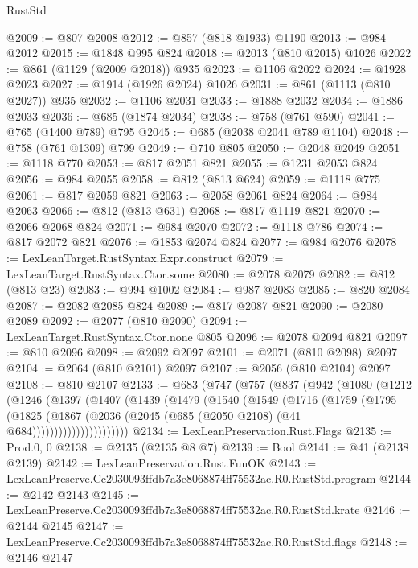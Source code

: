 \begin{lexlean}{RustStd}
\begin{coremodule}
@2009 := @807 @2008
@2012 := @857 (@818 @1933) @1190
@2013 := @984 @2012
@2015 := @1848 @995 @824
@2018 := @2013 (@810 @2015) @1026
@2022 := @861 (@1129 (@2009 @2018)) @935
@2023 := @1106 @2022
@2024 := @1928 @2023
@2027 := @1914 (@1926 @2024) @1026
@2031 := @861 (@1113 (@810 @2027)) @935
@2032 := @1106 @2031
@2033 := @1888 @2032
@2034 := @1886 @2033
@2036 := @685 (@1874 @2034)
@2038 := @758 (@761 @590)
@2041 := @765 (@1400 @789) @795
@2045 := @685 (@2038 @2041 @789 @1104)
@2048 := @758 (@761 @1309) @799
@2049 := @710 @805
@2050 := @2048 @2049
@2051 := @1118 @770
@2053 := @817 @2051 @821
@2055 := @1231 @2053 @824
@2056 := @984 @2055
@2058 := @812 (@813 @624)
@2059 := @1118 @775
@2061 := @817 @2059 @821
@2063 := @2058 @2061 @824
@2064 := @984 @2063
@2066 := @812 (@813 @631)
@2068 := @817 @1119 @821
@2070 := @2066 @2068 @824
@2071 := @984 @2070
@2072 := @1118 @786
@2074 := @817 @2072 @821
@2076 := @1853 @2074 @824
@2077 := @984 @2076
@2078 := LexLeanTarget.RustSyntax.Expr.construct
@2079 := LexLeanTarget.RustSyntax.Ctor.some
@2080 := @2078 @2079
@2082 := @812 (@813 @23)
@2083 := @994 @1002
@2084 := @987 @2083
@2085 := @820 @2084
@2087 := @2082 @2085 @824
@2089 := @817 @2087 @821
@2090 := @2080 @2089
@2092 := @2077 (@810 @2090)
@2094 := LexLeanTarget.RustSyntax.Ctor.none @805
@2096 := @2078 @2094 @821
@2097 := @810 @2096
@2098 := @2092 @2097
@2101 := @2071 (@810 @2098) @2097
@2104 := @2064 (@810 @2101) @2097
@2107 := @2056 (@810 @2104) @2097
@2108 := @810 @2107
@2133 := @683
    (@747
      (@757
        (@837
          (@942
            (@1080
              (@1212
                (@1246
                  (@1397
                    (@1407
                      (@1439
                        (@1479
                          (@1540
                            (@1549
                              (@1716
                                (@1759
                                  (@1795
                                    (@1825
                                      (@1867
                                        (@2036
                                          (@2045 (@685 (@2050 @2108) (@41 @684))))))))))))))))))))))
@2134 := LexLeanPreservation.Rust.Flags
@2135 := Prod.{0, 0}
@2138 := @2135 (@2135 @8 @7)
@2139 := Bool
@2141 := @41 (@2138 @2139)
@2142 := LexLeanPreservation.Rust.FunOK
@2143 := LexLeanPreserve.Cc2030093ffdb7a3e8068874ff75532ac.R0.RustStd.program
@2144 := @2142 @2143
@2145 := LexLeanPreserve.Cc2030093ffdb7a3e8068874ff75532ac.R0.RustStd.krate
@2146 := @2144 @2145
@2147 := LexLeanPreserve.Cc2030093ffdb7a3e8068874ff75532ac.R0.RustStd.flags
@2148 := @2146 @2147

\end{coremodule}
\end{lexlean}
